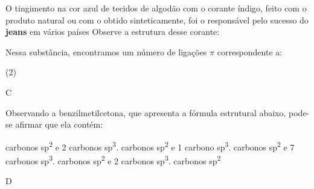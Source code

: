 \documentclass[10pt]{scrartcl}
\begin{document}
\begin{exercise}[points=1]
O tingimento na cor azul de tecidos de algodão com o corante índigo, feito com o produto natural ou com o obtido sinteticamente, foi o responsável pelo sucesso do \textbf{jeans} em vários países
Observe a estrutura desse corante:

\begin{center}
\end{center}

Nessa substância, encontramos um número de ligações \(\pi\) correspondente a:

\begin{choice}(2)
\end{choice}
\end{exercise}
\begin{solution}
C
\end{solution}


\begin{exercise}[points=1]
Observando a benzilmetilcetona, que apresenta a fórmula estrutural abaixo, pode-se afirmar que ela contém:

\begin{center}
\end{center}
\begin{choice}
 carbonos sp\textsuperscript{2} e 2 carbonos sp\textsuperscript{3}.
 carbonos sp\textsuperscript{2} e 1 carbono sp\textsuperscript{3}.
 carbonos sp\textsuperscript{2} e 7 carbonos sp\textsuperscript{3}.
 carbonos sp\textsuperscript{2} e 2 carbonos sp\textsuperscript{3}.
 carbonos sp\textsuperscript{2}
\end{choice}
\end{exercise}
\begin{solution}
D
\end{solution}
\end{document}
